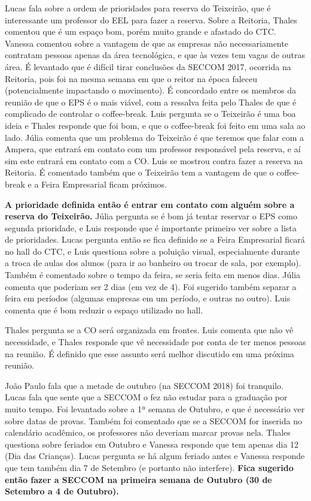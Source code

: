 \documentclass{ata-seccom}
\begin{document}
Lucas fala sobre a ordem de prioridades para reserva do Teixeirão, que é
interessante um professor do EEL para fazer a reserva. Sobre a Reitoria, Thales
comentou que é um espaço bom, porém muito grande e afastado do CTC\@. Vanessa
comentou sobre a vantagem de que as empresas não necessariamente contratam
pessoas apenas da área tecnológica, e que às vezes tem vagas de outras área. É
levantado que é difícil tirar conclusões da SECCOM 2017, ocorrida na Reitoria,
pois foi na mesma semana em que o reitor na época faleceu (potencialmente
impactando o movimento). É concordado entre os membros da reunião de que o EPS
é o mais viável, com a ressalva feita pelo Thales de que é complicado de
controlar o coffee-break. Luis pergunta se o Teixeirão é uma boa ideia e Thales
responde que foi bom, e que o coffee-break foi feito em uma sala ao lado. Júlia
comenta que um problema do Teixeirão é que teremos que falar com a Ampera, que
entrará em contato com um professor responsável pela reserva, e aí sim este
entrará em contato com a CO\@. Luis se mostrou contra fazer a reserva na
Reitoria. É comentado também que o Teixeirão tem a vantagem de que o
coffee-break e a Feira Empresarial ficam próximos.

\textbf{A prioridade definida então é entrar em contato com alguém sobre a
reserva do Teixeirão.} Júlia pergunta se é bom já tentar reservar o EPS como
segunda prioridade, e Luis responde que é importante primeiro ver sobre a lista
de prioridades. Lucas pergunta então se fica definido se a Feira Empresarial
ficará no hall do CTC, e Luis questiona sobre a poluição visual, especialmente
durante a troca de aulas dos alunos (para ir ao banheiro ou trocar de sala, por
exemplo). Também é comentado sobre o tempo da feira, se seria feita em menos
dias. Júlia comenta que poderiam ser 2 dias (em vez de 4). Foi sugerido também
separar a feira em períodos (algumas empresas em um período, e outras no
outro). Luis comenta que é bom reduzir o espaço utilizado no hall.


Thales pergunta se a CO será organizada em frontes. Luis comenta que não vê
necessidade, e Thales responde que vê necessidade por conta de ter menos
pessoas na reunião. É definido que esse assunto será melhor discutido em uma
próxima reunião.


João Paulo fala que a metade de outubro (na SECCOM 2018) foi tranquilo. Lucas
fala que sente que a SECCOM o fez não estudar para a graduação por muito tempo.
Foi levantado sobre a 1ª semana de Outubro, e que é necessário ver sobre datas
de provas. Também foi comentado que se a SECCOM for inserida no calendário
acadêmico, os professores não deveriam marcar provas nela. Thales questiona
sobre feriados em Outubro e Vanessa responde que tem apenas dia 12 (Dia das
Crianças). Lucas pergunta se há algum feriado antes e Vanessa responde que tem
também dia 7 de Setembro (e portanto não interfere). \textbf{Fica sugerido
então fazer a SECCOM na primeira semana de Outubro (30 de Setembro a 4 de
Outubro).}
\end{document}
